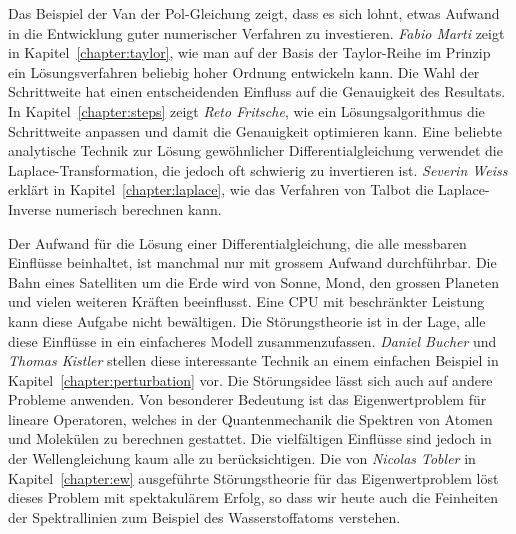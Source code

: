 Das Beispiel der Van der Pol-Gleichung zeigt, dass es sich lohnt,
etwas Aufwand in die Entwicklung guter numerischer Verfahren zu
investieren.
%
{\em Fabio Marti} zeigt in Kapitel~\ref{chapter:taylor}, wie man auf der
Basis der Taylor-Reihe im Prinzip ein Lösungsverfahren beliebig hoher Ordnung 
entwickeln kann.
%
%
Die Wahl der Schrittweite hat einen entscheidenden Einfluss auf die
Genauigkeit des Resultats.
%
In Kapitel~\ref{chapter:steps} zeigt
{\em Reto Fritsche}, wie ein Lösungsalgorithmus die Schrittweite
anpassen und damit die Genauigkeit optimieren kann.
%
Eine beliebte analytische Technik zur Lösung gewöhnlicher Differentialgleichung
verwendet die Laplace-Transformation, die jedoch oft schwierig zu
invertieren ist.
%
%
{\em Severin Weiss} erklärt in Kapitel~\ref{chapter:laplace}, wie 
das Verfahren von Talbot die Laplace-Inverse numerisch berechnen kann.
%

Der Aufwand für die Lösung einer Differentialgleichung, die alle
messbaren Einflüsse beinhaltet, ist manchmal nur mit grossem Aufwand
durchführbar.
Die Bahn eines Satelliten um die Erde wird von Sonne, Mond, den grossen
Planeten und vielen weiteren Kräften beeinflusst.
%
Eine CPU mit beschränkter Leistung kann diese Aufgabe nicht bewältigen.
Die Störungstheorie ist in der Lage, alle diese Einflüsse in ein einfacheres
Modell zusammenzufassen.
%
{\em Daniel Bucher} und {\em Thomas Kistler} stellen diese interessante
Technik an einem einfachen Beispiel in Kapitel~\ref{chapter:perturbation} vor.
%
%
Die Störungsidee lässt sich auch auf andere Probleme anwenden.
Von besonderer Bedeutung ist das Eigenwertproblem für lineare Operatoren,
welches in der Quantenmechanik die Spektren von Atomen und Molekülen
zu berechnen gestattet.
%
%
%
%
Die vielfältigen Einflüsse sind jedoch in der Wellengleichung kaum
alle zu berücksichtigen.
%
Die von {\em Nicolas Tobler} in Kapitel~\ref{chapter:ew} ausgeführte
Störungstheorie für das Eigenwertproblem löst dieses Problem mit
spektakulärem Erfolg, so dass wir heute auch die Feinheiten der
Spektrallinien zum Beispiel des Wasserstoffatoms verstehen.
%
%

